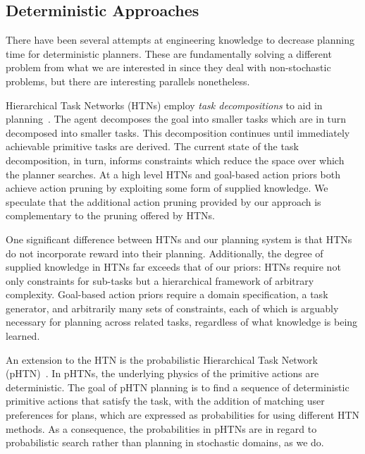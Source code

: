\documentclass[11pt]{article}
\begin{document}
\subsection{Deterministic Approaches}

There have been several attempts at engineering knowledge
to decrease planning time for deterministic planners. These are
fundamentally solving a different problem from what we are interested
in since they deal with non-stochastic problems, but there are
interesting parallels nonetheless.


Hierarchical Task Networks (HTNs) employ \textit{task decompositions}
to aid in planning~\cite{erol1994htn}. The agent decomposes the goal
into smaller tasks which are in turn decomposed into smaller
tasks. This decomposition continues until immediately achievable
primitive tasks are derived. The current state of the task
decomposition, in turn, informs constraints which reduce the space
over which the planner searches. At a high level HTNs and goal-based action priors
both achieve action pruning by exploiting some form of supplied
knowledge. We speculate that the additional action pruning provided by our approach
is complementary to the pruning offered by HTNs.

One significant difference between HTNs and our planning system is that HTNs do
not incorporate reward into their planning. Additionally, the degree of supplied knowledge in HTNs
far exceeds that of our priors: HTNs require not only constraints for
sub-tasks but a hierarchical framework of arbitrary
complexity. Goal-based action priors require a domain specification, a task generator, and arbitrarily many sets of constraints, each of which is arguably necessary for planning across related tasks, regardless of what knowledge is being learned.


An extension to the HTN is the probabilistic Hierarchical Task Network (pHTN)~\cite{li2010learning}. In pHTNs, the underlying physics of the primitive actions are deterministic. The goal of pHTN planning is to find a sequence of deterministic primitive actions that satisfy the task, with the addition of matching user preferences for plans, which are expressed as probabilities for using different HTN methods. As a consequence, the probabilities in pHTNs are in regard to probabilistic search rather than planning in stochastic domains, as we do.

\end{document}
